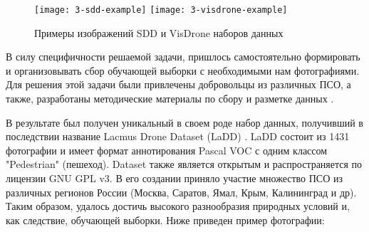 \begin{figure}[H]
    \centering
    \texttt{[image: 3-sdd-example]}
    \hfill
    \texttt{[image: 3-visdrone-example]}
    \caption{Примеры изображений SDD и VisDrone наборов данных} \label{sdd-visdrone-example}
\end{figure}


В силу специфичности решаемой задачи, пришлось самостоятельно формировать и организовывать сбор обучающей выборки с необходимыми нам фотографиями. Для решения этой задачи были привлечены добровольцы из различных ПСО, а также, разработаны методические материалы по сбору и разметке данных \cite{lib-lacmus-wiki-images}\cite{lib-lacmus-wiki-label}.

В результате был получен уникальный в своем роде набор данных, получивший в последствии название Lacmus Drone Dataset (LaDD) \cite{lib-ladd}. LaDD состоит из 1431 фотографии и имеет формат аннотирования Pascal VOC \cite{lib-pascal} с одним классом "Pedestrian" (пешеход). Dataset также является открытым и распространяется по лицензии GNU GPL v3. В его создании приняло участие множество ПСО из различных регионов России (Москва, Саратов, Ямал, Крым, Калининград и др). Таким образом, удалось достичь высокого разнообразия природных условий и, как следствие, обучающей выборки. Ниже приведен пример фотографии:

